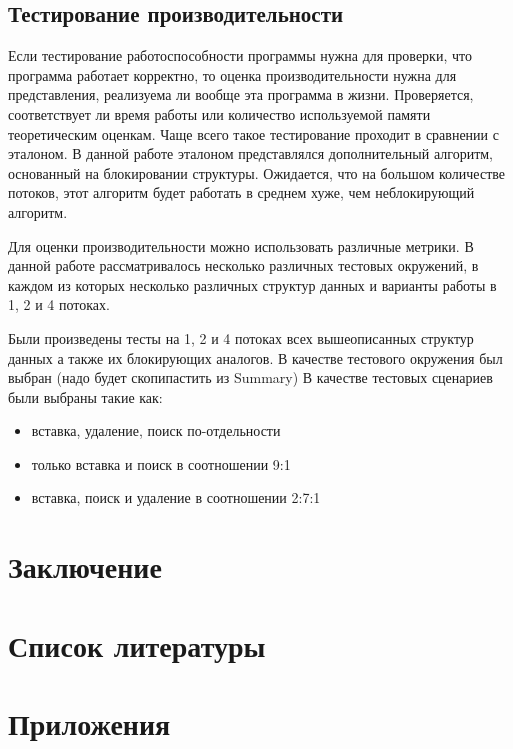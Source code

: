 \documentclass[12pt]{article}
\begin{document}
{				\subsection{Тестирование производительности}
					\par Если тестирование работоспособности программы нужна для проверки, что программа работает корректно, то оценка производительности нужна для представления, реализуема ли вообще эта программа в жизни. Проверяется, соответствует ли время работы или количество используемой памяти теоретическим оценкам. Чаще всего такое тестирование проходит в сравнении с эталоном. В данной работе эталоном представлялся дополнительный алгоритм, основанный на блокировании структуры. Ожидается, что на большом количестве потоков, этот алгоритм будет работать в среднем хуже, чем неблокирующий алгоритм.
					\par Для оценки производительности можно использовать различные метрики. В данной работе рассматривалось несколько различных тестовых окружений, в каждом из которых несколько различных структур данных и варианты работы в 1, 2 и 4 потоках. 
					\par Были произведены тесты на 1, 2 и 4 потоках всех вышеописанных структур данных а также их блокирующих аналогов. В качестве тестового окружения был выбран (надо будет скопипастить из Summary)
					В качестве тестовых сценариев были выбраны такие как: 
					\begin{itemize}
						\item вставка, удаление, поиск по-отдельности
						\item только вставка и поиск в соотношении 9:1
						\item вставка, поиск и удаление в соотношении 2:7:1			
					\end{itemize}
				
				
		\newpage
		
		\section{Заключение}
		
		\newpage
		
		\section{Список литературы}
		
		\newpage
		
		\section{Приложения}
	}
	
\end{document}
